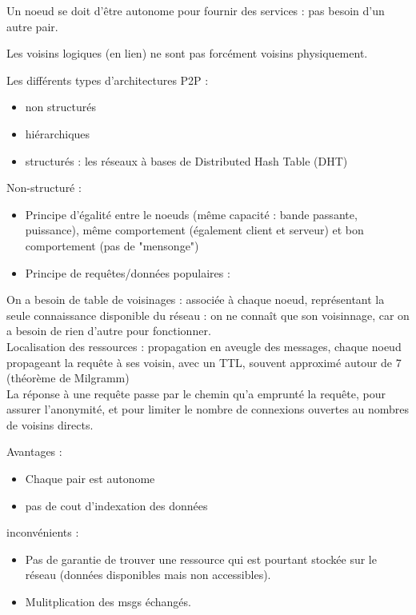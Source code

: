{Un noeud se doit d'être autonome pour fournir des services : pas besoin d'un autre pair.

Les voisins logiques (en lien) ne sont pas forcément voisins physiquement.

Les différents types d'architectures P2P :
\begin{itemize}
	\item non structurés
	\item hiérarchiques
	\item structurés : les réseaux à bases de Distributed Hash Table (DHT)
\end{itemize}

Non-structuré :
\begin{itemize}
	\item Principe d'égalité entre le noeuds (même capacité : bande passante, puissance), même comportement (également client et serveur) et bon comportement (pas de "mensonge")
	\item Principe de requêtes/données populaires : 
\end{itemize}

On a besoin de table de voisinages : associée à chaque noeud, représentant la seule connaissance disponible du réseau : on ne connaît que son voisinnage, car on a besoin de rien d'autre pour fonctionner.\\
Localisation des ressources : propagation en aveugle des messages, chaque noeud propageant la requête à ses voisin, avec un TTL, souvent approximé autour de 7 (théorème de Milgramm)\\

La réponse à une requête passe par le chemin qu'a emprunté la requête, pour assurer l'anonymité, et pour limiter le nombre de connexions ouvertes au nombres de voisins directs.

Avantages :
\begin{itemize}
	\item Chaque pair est autonome
	\item pas de cout d'indexation des données
\end{itemize}

inconvénients :
\begin{itemize}
	\item Pas de garantie de trouver une ressource qui est pourtant stockée sur le réseau (données disponibles mais non accessibles).
	\item Mulitplication des msgs échangés.
\end{itemize}


}
